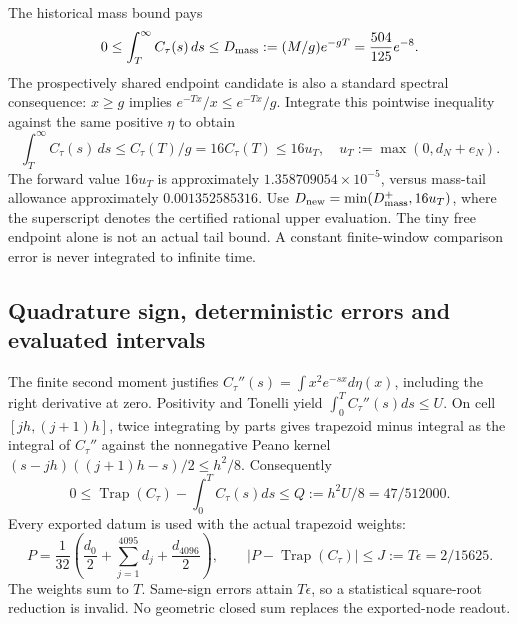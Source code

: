 The historical mass bound pays
\begin{equation}
 0\le\int_T^\infty C_\tau(s)\,ds
 \le D_{\rm mass}:=(M/g)e^{-gT}=\frac{504}{125}e^{-8}.
 \label{eq:mass-tail}
\end{equation}
The prospectively shared endpoint candidate is also a standard spectral
consequence: $x\ge g$ implies $e^{-Tx}/x\le e^{-Tx}/g$. Integrate this pointwise
inequality against the same positive $\eta$ to obtain
\begin{equation}
 \int_T^\infty C_\tau(s)\,ds\le C_\tau(T)/g
 =16C_\tau(T)\le16u_T,
 \quad u_T:=\max(0,d_N+e_N).
 \label{eq:endpoint-tail}
\end{equation}
The forward value $16u_T$ is approximately $1.358709054\times10^{-5}$,
versus mass-tail allowance approximately $0.001352585316$.
Use $D_{\rm new}=\min(D_{\rm mass}^+,16u_T)$, where the superscript denotes
the certified rational upper evaluation. The tiny free endpoint alone is not
an actual tail bound. A constant finite-window comparison error is never
integrated to infinite time.

\subsection{Quadrature sign, deterministic errors and evaluated intervals}
The finite second moment justifies $C_\tau''(s)=\int x^2e^{-sx}d\eta(x)$,
including the right derivative at zero. Positivity and Tonelli yield
$\int_0^T C_\tau''(s)ds\le U$. On cell $[jh,(j+1)h]$, twice integrating by
parts gives trapezoid minus integral as the integral of $C_\tau''$ against
the nonnegative Peano kernel
$(s-jh)((j+1)h-s)/2\le h^2/8$. Consequently
\begin{equation}
 0\le\operatorname{Trap}(C_\tau)-\int_0^T C_\tau(s)ds
 \le Q:=h^2U/8=47/512000.
 \label{eq:quadrature}
\end{equation}
Every exported datum is used with the actual trapezoid weights:
\begin{equation}
 P=\frac1{32}\left(\frac{d_0}2+\sum_{j=1}^{4095}d_j+
 \frac{d_{4096}}2\right),\qquad
 |P-\operatorname{Trap}(C_\tau)|\le J:=T\epsilon=2/15625.
 \label{eq:readout}
\end{equation}
The weights sum to $T$. Same-sign errors attain $T\epsilon$, so a statistical
square-root reduction is invalid. No geometric closed sum replaces the
exported-node readout.

